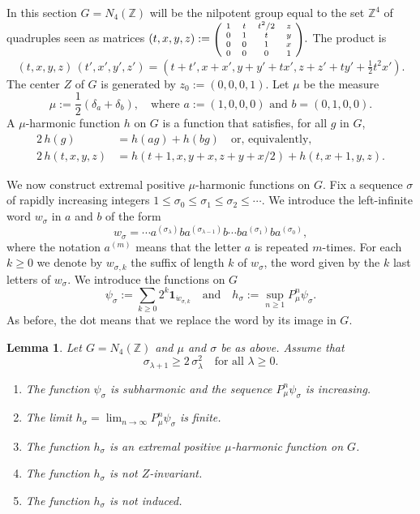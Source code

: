 \documentclass[JEP,XML,SOM,Unicode]{cedram}
\newenvironment{enumeratea}
{\bgroup\def\theenumi{\alph{enumi}}\begin{enumerate}}
{\end{enumerate}\egroup}
\newtheorem{Lem}[Thm]{Lemma}
\theoremstyle{definition}
\newcommand{\m}[1]{\mathbb{ #1}}
\let\de\delta
\let\la\lambda
\let\si\sigma
\begin{document}
In this section $G=N_4(\m Z)$ will be the nilpotent group equal to the set $\m Z^4$
of quadruples seen as matrices
$(t,x,y,z):=\mbox{\scriptsize $\left(\!
\begin{array}{cccc} 1 &t&t^2/2&z \\
0 &1&t&y\\0&0&1&x\\0&0&0&1
\end{array}\!\right)$}.$ The product is
\begin{equation*}
\label{eqnprofour}
(t,x,y,z)\, (t',x',y',z')= (t+t',x+x',y+y'+tx',z+z'+ty'+\tfrac12 t^2x').
\end{equation*}
The center $Z$ of $G$ is generated by $z_0:=(0,0,0,1)$.
Let $\mu$ be the measure
\begin{equation*}
\label{eqnmu0}
\mu:=\frac12(\de_{a}+\de_{b}),
\quad\text{where $a:=(1,0,0,0)$ and $b=(0,1,0,0)$.}
\end{equation*}
A $\mu$-harmonic function $h$ on $G$ is a function that satisfies, for all $g$ in $G$,
\begin{align*}
\label{eqnhghaghbg}
2\,h(g)&= h(ag)+ h(bg)
\quad\text{or, equivalently,}\\
2\,h(t,x,y,z)&= h(t\!+\!1,x,y+x,z\!+\!y\!+\! x/2)+ h(t,x\!+\!1,y,z).
\end{align*}

We now construct
extremal positive $\mu$-harmonic functions on $G$. Fix a sequence $\si$ of rapidly increasing integers $1\leq \si_0\leq \si_1\leq \si_2\leq\cdots$.
We introduce the left-infinite word $w_\si$ in $a$ and $b$ of the form
\[
w_\si = \cdots a^{(\si_{\la})}ba^{(\si_{\la-1})}b\cdots ba^{(\si_1)}ba^{(\si_0)},
\]
where the notation $a^{(m)}$ means that the letter $a$ is repeated $m$-times.
For each $k\geq 0$ we denote by $w_{\si,k}$ the suffix of length $k$ of $w_\si$,
\ie the word given by the $k$ last letters of $w_\si$.
We introduce the functions on $G$
\[
\psi_\si:=\sum_{k\geq 0}2^k\mathbf{1}_{\dot{w}_{\si,k}}
\quad\text{and}\quad
h_\si:=\sup_{n\geq 1}P_\mu^n\psi_\si.
\]
As before, the dot means that we replace the word by its image in $G$.

\begin{Lem}
\label{lemnilpfour}
Let $G=N_4(\m Z)$ and $\mu$ and $\si$ be as above. Assume that
\begin{equation}
\label{eqnsilaincrease}
\si_{\la+1}\geq 2\, \si_{\la}^2
\quad\text{for all $\la\geq 0$}.
\end{equation}
\begin{enumeratea}
\item\label{lemnilpfoura}
The function $\psi_\si$ is subharmonic and the sequence $P_\mu^n\psi_\si$ is increasing.
\item\label{lemnilpfourb}
The limit $h_\si=\lim_{n\to \infty}P_\mu^n\psi_\si$ is finite.
\item\label{lemnilpfourc}
The function $h_\si$ is an extremal positive $\mu$-harmonic function on $G$.
\item\label{lemnilpfourd}
The function $h_\si$ is not $Z$-invariant.
\item\label{lemnilpfoure}
The function $h_\si$ is not induced.
\end{enumeratea}
\end{Lem}
\end{document}
